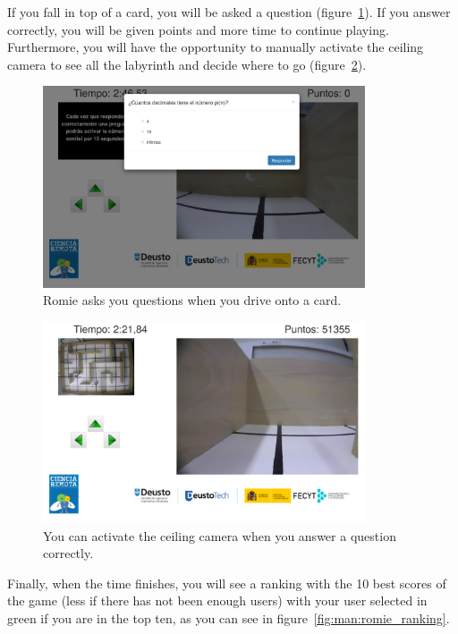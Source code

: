 If you fall in top of a card, you will be asked a question (figure~\ref{fig:man:romie_question}). If
you answer correctly, you will be given points and more time to continue playing. Furthermore, you
will have the opportunity to manually activate the ceiling camera to see all the labyrinth and
decide where to go (figure~\ref{fig:man:romie_ceiling}).

\begin{figure}[!htbp]
	\centering
	\includegraphics[width=0.85\textwidth]{fig/manuals/trivial/romie-question}
	\caption{Romie asks you questions when you drive onto a card.}
	\label{fig:man:romie_question}
\end{figure}

\begin{figure}[!htbp]
	\centering
	\includegraphics[width=0.85\textwidth]{fig/manuals/trivial/romie-ceiling}
	\caption{You can activate the ceiling camera when you answer a question correctly.}
	\label{fig:man:romie_ceiling}
\end{figure}

Finally, when the time finishes, you will see a ranking with the 10 best scores of the game (less if
there has not been enough users) with your user selected in green if you are in the top ten, as you
can see in figure~\ref{fig:man:romie_ranking}.

